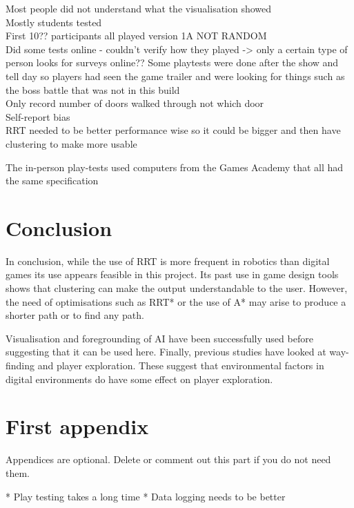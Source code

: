 \documentclass[journal]{IEEEtran}
\begin{document}
	Most people did not understand what the visualisation showed \\ 
	Mostly students tested \\
	First 10?? participants all played version 1A NOT RANDOM \\
	Did some tests online  - couldn't verify how they played -> only a certain type of person looks for surveys online??
	Some playtests were done after the show and tell day so players had seen the game trailer and were looking for things such as the boss battle that was not in this build \\
	Only record number of doors walked through not which door \\
	Self-report bias\\
	RRT needed to be better performance wise so it could be bigger and then have clustering to make more usable 
	
	The in-person play-tests used computers from the Games Academy that all had the same specification 
	
	\section{Conclusion} 
	In conclusion, while the use of RRT is more frequent in robotics than digital games its use appears feasible in this project. Its past use in game design tools shows that clustering can make the output understandable to the user. However, the need of optimisations such as RRT* or the use of A* may arise to produce a shorter path or to find any path. 
	
	Visualisation and foregrounding of AI have been successfully used before suggesting that it can be used here. Finally, previous studies have looked at way-finding and player exploration. These suggest that environmental factors in digital environments do have some effect on player exploration.
	
	
	
	
	
	
	\appendices
	\section{First appendix}
	Appendices are optional. Delete or comment out this part if you do not need them.
	
	* Play testing takes a long time
	* Data logging needs to be better 
	
	
\end{document}
